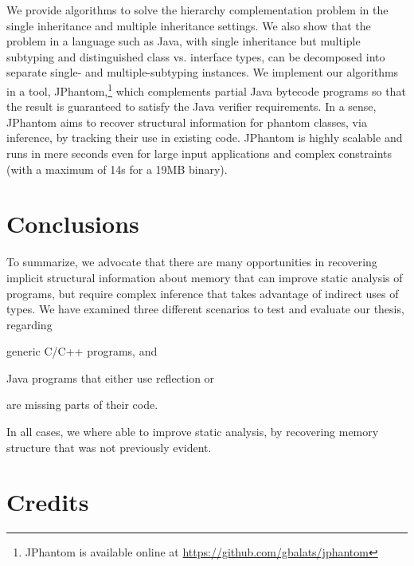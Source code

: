 \documentclass{llncs}
\begin{document}
We provide algorithms to solve the hierarchy complementation problem
in the single inheritance and multiple inheritance settings.  We also
show that the problem in a language such as Java, with single
inheritance but multiple subtyping and distinguished class
vs. interface types, can be decomposed into separate single- and
multiple-subtyping instances.  We implement our algorithms in a tool,
JPhantom,\footnote{JPhantom is available online at
  \url{https://github.com/gbalats/jphantom}} which complements partial
Java bytecode programs so that the result is guaranteed to satisfy the
Java verifier requirements. In a sense, JPhantom aims to recover
structural information for phantom classes, via inference, by tracking
their use in existing code. JPhantom is highly scalable and runs in
mere seconds even for large input applications and complex constraints
(with a maximum of 14s for a 19MB binary).

\section{Conclusions}

To summarize, we advocate that there are many opportunities in
recovering implicit structural information about memory that can
improve static analysis of programs, but require complex inference
that takes advantage of indirect uses of types. We have examined three
different scenarios to test and evaluate our thesis, regarding
\begin{inparablank}
\item generic C/C++ programs, and
\item Java programs that either use reflection or
\item are missing parts of their code.
\end{inparablank}
In all cases, we where able to improve static analysis, by recovering
memory structure that was not previously evident.

\section{Credits}
\end{document}
